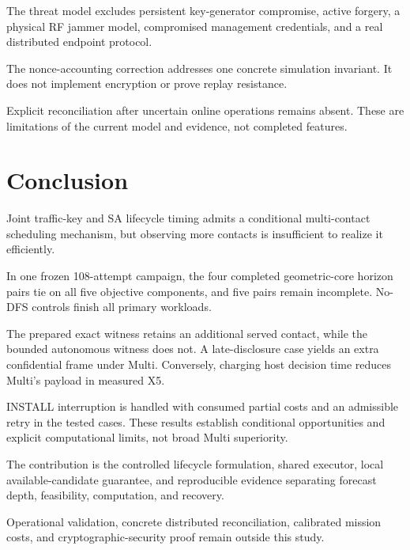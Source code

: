 \documentclass[conference]{IEEEtran}
\begin{document}
The threat model excludes persistent key-generator compromise,
active forgery, a physical RF jammer model, compromised
management credentials, and a real distributed endpoint
protocol.

The nonce-accounting correction addresses one concrete
simulation invariant.
It does not implement encryption or prove replay resistance.

Explicit reconciliation after uncertain online operations
remains absent.
These are limitations of the current model and evidence,
not completed features.


\section{Conclusion}
\label{sec:conclusion}

Joint traffic-key and SA lifecycle timing admits a conditional
multi-contact scheduling mechanism, but observing more
contacts is insufficient to realize it efficiently.

In one frozen 108-attempt campaign, the four completed
geometric-core horizon pairs tie on all five objective
components, and five pairs remain incomplete.
No-DFS controls finish all primary workloads.

The prepared exact witness retains an additional served
contact, while the bounded autonomous witness does not.
A late-disclosure case yields an extra confidential frame
under Multi.
Conversely, charging host decision time reduces Multi's
payload in measured X5.

INSTALL interruption is handled with consumed partial costs
and an admissible retry in the tested cases.
These results establish conditional opportunities and explicit
computational limits, not broad Multi superiority.

The contribution is the controlled lifecycle formulation,
shared executor, local available-candidate guarantee,
and reproducible evidence separating forecast depth,
feasibility, computation, and recovery.

Operational validation, concrete distributed reconciliation,
calibrated mission costs, and cryptographic-security proof
remain outside this study.

\FloatBarrier

%
\end{document}
